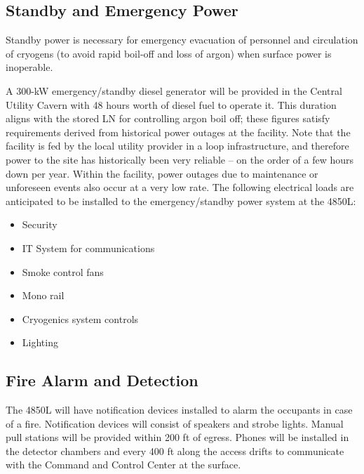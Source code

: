 \subsection{Standby and Emergency Power}
\label{sec:fscf-und-emerg-pwr}

Standby power is necessary for emergency %
evacuation of personnel %
and circulation of cryogens (to avoid rapid boil-off and loss of argon) when surface power is inoperable.

A 300-kW emergency/standby diesel generator will be provided in the Central Utility Cavern with %
48 hours worth of diesel fuel to operate it. This duration aligns with the stored LN for controlling argon boil off; these figures satisfy requirements derived from historical power outages at the facility.  Note that the facility is fed by the local utility provider in a loop infrastructure, and therefore power to the site has historically been very reliable -- on the order of a few hours down per year.  Within the facility, power outages due to maintenance or unforeseen events also occur at a very low rate.  The following electrical loads are anticipated to be installed to the emergency/standby power system at the 4850L:

\begin{itemize}
\item Security
\item IT System for communications
\item Smoke control fans
\item Mono rail
\item Cryogenics system controls
\item Lighting
\end{itemize}

\subsection{Fire Alarm and Detection}
\label{sec:fscf-und-fire-alarm}

The 4850L will have notification devices installed to alarm the occupants in case of a fire. Notification devices will consist of speakers and strobe lights. Manual pull stations will be provided within 200 ft of egress. Phones will be installed in the detector chambers and every 400 ft along the access drifts to communicate with the Command and Control Center at the surface.

